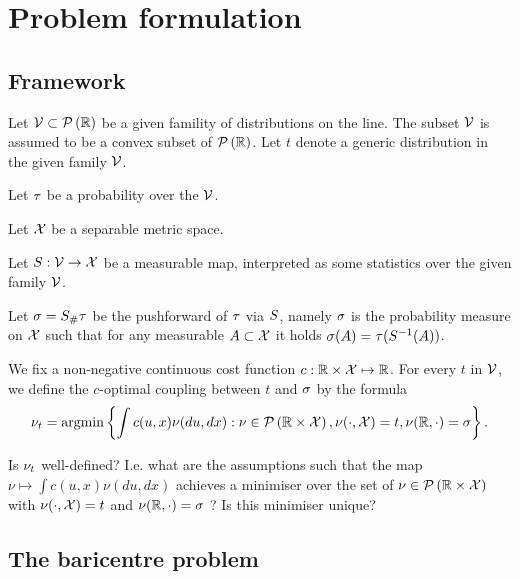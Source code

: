 \section{Problem formulation}

\subsection{Framework}

Let
$\givenFamily \subset \probabilitiesOver{\R}$ 
be a given famility of distributions on the line. 
The subset $\givenFamily$ is assumed to be a 
convex subset of $\probabilitiesOver{\R}$.
Let
$t$ 
denote a generic distribution in the given family $\givenFamily$.

Let
$\familiyDistribution$ 
be a probability over the $\givenFamily$. 

Let
$\statisticsSpace$ 
be a separable metric space.

Let
$\statistics: \givenFamily \rightarrow \statisticsSpace$ 
be a measurable map, 
interpreted as some statistics over the given family $\givenFamily$.

Let 
$\pushforwardStat = \statistics_{\#} \familiyDistribution$
be the pushforward of $\familiyDistribution$ via $\statistics$,
namely 
$\pushforwardStat$ is the probability measure on $\statisticsSpace$
such that for any measurable $A \subset \statisticsSpace$ 
it holds
$\pushforwardStat(A) = \familiyDistribution (\statistics\inverse(A))$.


We fix a non-negative continuous cost function
$c:\R \times \statisticsSpace \mapsto \R$.
For every $t$ in $\givenFamily$,
we define the $c$-optimal coupling between 
$t$ and $\pushforwardStat$ by the formula
\begin{equation}
\label{eq.definition_of_t_coupling}
\coupling[t] = 
\argmin 
\left\lbrace
\int c(u, x)\nu(du, dx):
\nu \in \probabilitiesOver{\R\times \statisticsSpace},
\nu(\cdot, \statisticsSpace) = t,
\nu(\R, \cdot) = \pushforwardStat
\right\rbrace.
\end{equation}

Is $\coupling[t]$ well-defined? 
I.e. what are the assumptions such that the map 
$
\nu\mapsto \int c(u, x) \nu(du, dx)
$
achieves a minimiser over the set of 
$
\nu \in \probabilitiesOver{\R\times \statisticsSpace}
$
with
$
\nu(\cdot, \statisticsSpace) = t
$
and 
$
\nu(\R, \cdot) = \pushforwardStat
$
?
Is this minimiser unique?


\subsection{The baricentre problem}

